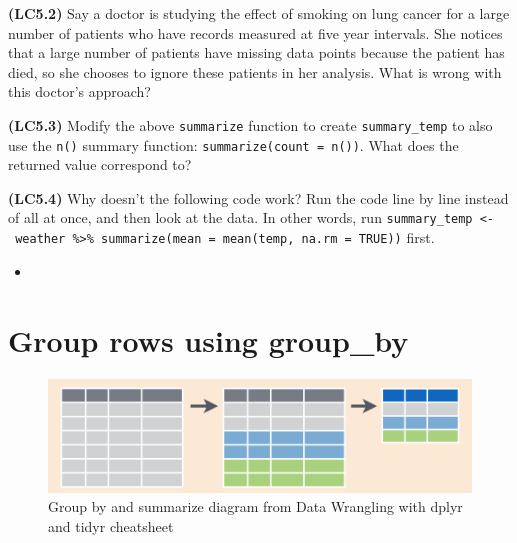 \documentclass[12pt,]{krantz}
\makeatletter
\newenvironment{Shaded}{\begin{snugshade}}{\end{snugshade}}
\newcommand{\KeywordTok}[1]{\textcolor[rgb]{0.27,0.27,0.27}{\textbf{#1}}}
\newcommand{\DataTypeTok}[1]{\textcolor[rgb]{0.27,0.27,0.27}{#1}}
\newcommand{\StringTok}[1]{\textcolor[rgb]{0.5,0.5,0.5}{#1}}
\newcommand{\OtherTok}[1]{\textcolor[rgb]{0.37,0.37,0.37}{#1}}
\newcommand{\OperatorTok}[1]{\textcolor[rgb]{0.43,0.43,0.43}{\textbf{#1}}}
\newcommand{\NormalTok}[1]{#1}
\newenvironment{kframe}{%
\medskip{}
\setlength{\fboxsep}{.8em}
 \def\at@end@of@kframe{}%
 \ifinner\ifhmode%
  \def\at@end@of@kframe{\end{minipage}}%
  \begin{minipage}{\columnwidth}%
 \fi\fi%
 \def\FrameCommand##1{\hskip\@totalleftmargin \hskip-\fboxsep
 \colorbox{shadecolor}{##1}\hskip-\fboxsep
     \hskip-\linewidth \hskip-\@totalleftmargin \hskip\columnwidth}%
 \MakeFramed {\advance\hsize-\width
   \@totalleftmargin\z@ \linewidth\hsize
   \@setminipage}}%
 {\par\unskip\endMakeFramed%
 \at@end@of@kframe}
\renewenvironment{Shaded}{\begin{kframe}}{\end{kframe}}
\newenvironment{rmdblock}[1]
  {\begin{shaded*}
  \begin{itemize}
  \renewcommand{\labelitemi}{
    \raisebox{-.7\height}[0pt][0pt]{
    }
  }
  \item
  }
  {
  \end{itemize}
  \end{shaded*}
  }
\newenvironment{learncheck}
  {\begin{rmdblock}{warning}}
  {\end{rmdblock}}
\makeatother
\begin{document}
\textbf{(LC5.2)} Say a doctor is studying the effect of smoking on lung
cancer for a large number of patients who have records measured at five
year intervals. She notices that a large number of patients have missing
data points because the patient has died, so she chooses to ignore these
patients in her analysis. What is wrong with this doctor's approach?

\textbf{(LC5.3)} Modify the above \texttt{summarize} function to create
\texttt{summary\_temp} to also use the \texttt{n()} summary function:
\texttt{summarize(count\ =\ n())}. What does the returned value
correspond to?

\textbf{(LC5.4)} Why doesn't the following code work? Run the code line
by line instead of all at once, and then look at the data. In other
words, run
\texttt{summary\_temp\ \textless{}-\ weather\ \%\textgreater{}\%\ summarize(mean\ =\ mean(temp,\ na.rm\ =\ TRUE))}
first.

\begin{Shaded}
\end{Shaded}

\begin{learncheck}

\end{learncheck}

\section{Group rows using group\_by}\label{groupby}

\begin{figure}

{\centering \includegraphics[width=\textwidth]{images/group_summary} 

}

\caption{Group by and summarize diagram from Data Wrangling with dplyr and tidyr cheatsheet}\label{fig:groupsummarize}
\end{figure}
\end{document}
